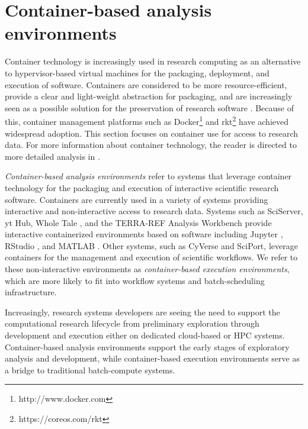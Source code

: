 \documentclass{sig-alternate}
\begin{document}

\section{Container-based analysis environments}

Container technology is increasingly used in research computing as an alternative to hypervisor-based virtual machines for the packaging, deployment, and execution of software. Containers are considered to be more resource-efficient, provide a clear and light-weight abstraction for packaging, and are increasingly seen as a possible solution for the preservation of research software \cite{Meng2015137}.  Because of this, container management platforms such as Docker\footnote{http://www.docker.com} and rkt\footnote{https://coreos.com/rkt} have achieved widespread adoption. This section focuses on container use for access to research data. For more information about container technology, the reader is directed to more detailed analysis in \cite{7036275,7095802,Soltesz:2007:COS:1272998.1273025}. 

\emph{Container-based analysis environments} refer to systems that leverage container technology for the packaging and execution of interactive scientific research software. Containers are currently used in a variety of systems providing interactive and non-interactive access to research data. Systems such as SciServer, yt Hub, Whole Tale \cite{ludaescher2016capturing}, and the TERRA-REF Analysis Workbench provide interactive containerized environments based on software including Jupyter \cite{kluyver2016jupyter}, RStudio \cite{Rstudio2015}, and MATLAB \cite{mathworks}. Other systems, such as CyVerse\cite{devisetty2016bringing} and SciPort\cite{Gerlach:2014:SCE:2689676.2689680}, leverage containers for the management and execution of scientific workflows. We refer to these non-interactive environments as \emph{container-based execution environments}, which are more likely to fit into workflow systems and batch-scheduling infrastructure.  

Increasingly, research systems developers are seeing the need to support the computational research lifecycle from preliminary exploration through development and execution either on dedicated cloud-based or HPC systems. Container-based analysis environments support the early stages of exploratory analysis and development, while container-based execution environments serve as a bridge to traditional batch-compute systems.
\end{document}
